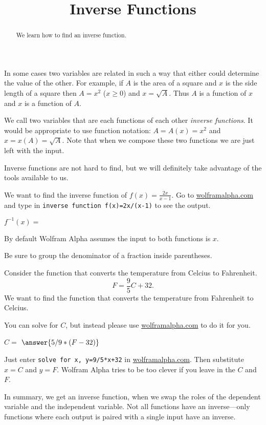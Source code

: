 \documentclass{ximera}
\title{Inverse Functions}
\begin{document}
\begin{abstract}
We learn how to find an inverse function.
\end{abstract}
\maketitle

In some cases two variables are related in such a way that either could determine the value of the other. For example, if $A$ is the area of a square and $x$ is the side length of a square then $A=x^2$ ($x\ge0$) and $x=\sqrt{A}$. Thus $A$ is a function of $x$ and $x$ is a function of $A$.

We call two variables that are each functions of each other \emph{inverse functions}. It would be appropriate to use function notation: $A=A(x)=x^2$ and $x=x(A)=\sqrt{A}$. Note that when we compose these two functions we are just left with the input. 

Inverse functions are not hard to find, but we will definitely take advantage of the tools available to us. 

\begin{question}
We want to find the inverse function of $f(x)=\frac{2x}{x-1}$.
Go to \url{wolframalpha.com} and type in \verb|inverse function f(x)=2x/(x-1)| to see the output.
\begin{solution}
$f^{-1}(x)=$ 
\begin{hint}
By default Wolfram Alpha assumes the input to both functions is $x$.
\end{hint}
\begin{hint}
Be sure to group the denominator of a fraction inside parentheses.
\end{hint}
\end{solution}
\end{question}



\begin{question}
Consider the function that converts the temperature from Celcius to Fahrenheit. 
\[
F=\frac{9}{5}C+32.
\]
We want to find the function that converts the temperature from Fahrenheit to Celcius.

You can solve for $C$, but instead please use \url{wolframalpha.com} to do it for you.

\begin{solution}
$C=$ $\answer{5/9*(F-32)}$
\begin{hint}
Just enter \verb|solve for x, y=9/5*x+32| in \url{wolframalpha.com}. Then substitute $x=C$ and $y=F$. Wolfram Alpha tries to be too clever if you leave in the $C$ and $F$.
\end{hint}
\end{solution}

In summary, we get an inverse function, when we swap the roles of the dependent variable and the independent variable. Not all functions have an inverse---only functions where each output is paired with a single input have an inverse.
\end{question}
\end{document}
